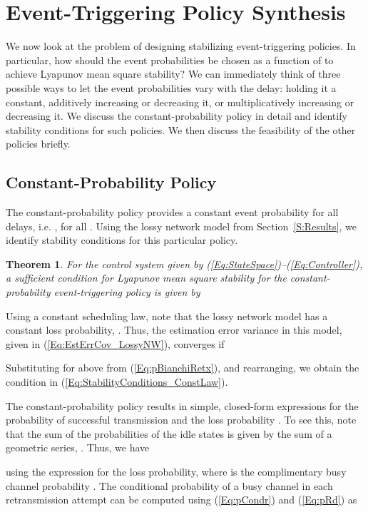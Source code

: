 \documentclass[twocolumn]{autart}
\newtheorem{theorem}{Theorem}[section]
\newenvironment{proof}[1][Proof]{\begin{trivlist}
\item[\hskip \labelsep {\bfseries #1}]}{\end{trivlist}}
\renewcommand{\qed}{}
\begin{document}
\section{Event-Triggering Policy Synthesis} \label{S:SchedDesign}
We now look at the problem of designing stabilizing event-triggering policies. In particular, how should the event probabilities  be chosen as a function of  to achieve Lyapunov mean square stability? We can immediately think of three possible ways to let the event probabilities vary with the delay: holding it a constant, additively increasing or decreasing it, or multiplicatively increasing or decreasing it. We discuss the constant-probability policy in detail and identify stability conditions for such policies. We then discuss the feasibility of the other policies briefly.

\subsection{Constant-Probability Policy}
The constant-probability policy provides a constant event probability for all delays, i.e. , for all . Using the lossy network model from Section~\ref{S:Results}, we identify stability conditions for this particular policy.

\begin{theorem} \label{Thm:ConstLaw}
For the control system given by (\ref{Eq:StateSpace})--(\ref{Eq:Controller}), a sufficient condition for Lyapunov mean square stability for the constant-probability event-triggering policy is given by

\end{theorem}
\begin{proof}
Using a constant scheduling law, note that the lossy network model has a constant loss probability, . Thus, the estimation error variance in this model, given in (\ref{Eq:EstErrCov_LossyNW}), converges if

Substituting for  above from (\ref{Eq:pBianchiRetx}), and rearranging, we obtain the condition in (\ref{Eq:StabilityConditions_ConstLaw}). \hfill \qed
\end{proof}

The constant-probability policy results in simple, closed-form expressions for the probability of successful transmission  and the loss probability . To see this, note that the sum of the probabilities of the idle states is given by the sum of a geometric series, . Thus, we have

using the expression for the loss probability, where  is the complimentary busy channel probability . The conditional probability of a busy channel in each retransmission attempt can be computed using (\ref{Eq:pCondr}) and (\ref{Eq:pRd}) as
\end{document}
